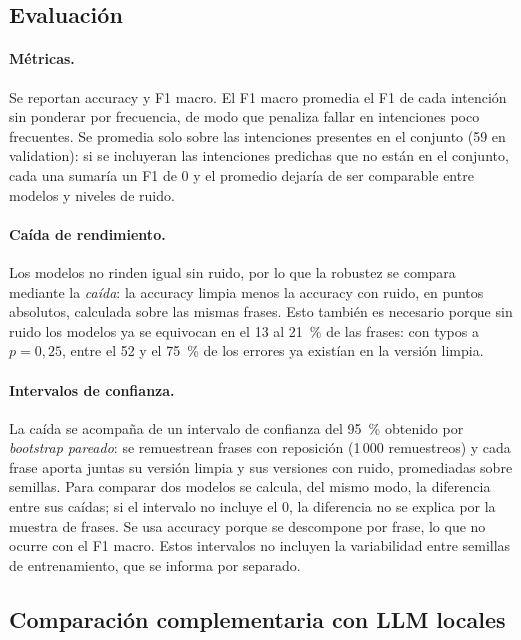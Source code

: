 \documentclass[11pt,a4paper]{article}
\begin{document}
\subsection{Evaluación}
\label{sec:evaluacion}

\paragraph{Métricas.} Se reportan accuracy y F1 macro. El F1 macro promedia el F1 de cada
intención sin ponderar por frecuencia, de modo que penaliza fallar en intenciones poco
frecuentes. Se promedia solo sobre las intenciones presentes en el conjunto (59 en
validation): si se incluyeran las intenciones predichas que no están en el conjunto, cada una
sumaría un F1 de 0 y el promedio dejaría de ser comparable entre modelos y niveles de ruido.

\paragraph{Caída de rendimiento.} Los modelos no rinden igual sin ruido, por lo que la robustez
se compara mediante la \emph{caída}: la accuracy limpia menos la accuracy con ruido, en puntos
absolutos, calculada sobre las mismas frases. Esto también es necesario porque sin ruido los
modelos ya se equivocan en el 13 al 21~\% de las frases: con typos a $p=0{,}25$, entre el 52 y
el 75~\% de los errores ya existían en la versión limpia.

\paragraph{Intervalos de confianza.} La caída se acompaña de un intervalo de confianza del
95~\% obtenido por \emph{bootstrap pareado}:
se remuestrean frases con reposición (1\,000 remuestreos) y cada frase aporta juntas su versión
limpia y sus versiones con ruido, promediadas sobre semillas. Para comparar dos modelos se
calcula, del mismo modo, la diferencia entre sus caídas; si el intervalo no incluye el 0, la
diferencia no se explica por la muestra de frases. Se usa accuracy porque se descompone por
frase, lo que no ocurre con el F1 macro. Estos intervalos no incluyen la variabilidad entre
semillas de entrenamiento, que se informa por separado.

\subsection{Comparación complementaria con LLM locales}
\label{sec:llm-metodo}
\end{document}
